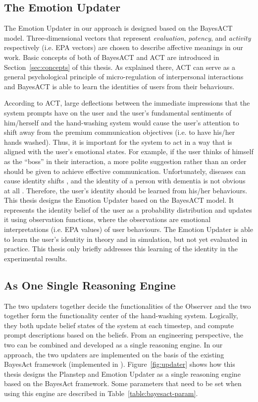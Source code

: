 \subsection{The Emotion Updater}

The Emotion Updater in our approach is designed based on the BayesACT model. Three-dimensional vectors that represent \textit{evaluation}, \textit{potency}, and \textit{activity} respectively (i.e. EPA vectors) are chosen to describe affective meanings in our work. Basic concepts of both of BayesACT and ACT are introduced in Section~\ref{sec:concepts} of this thesis. As explained there, ACT can serve as a general psychological principle of micro-regulation of interpersonal interactions and BayesACT is able to learn the identities of users from their behaviours.

According to ACT, large deflections between the immediate impressions that the system prompts have on the user and the user's fundamental sentiments of him/herself and the hand-washing system would cause the user's attention to shift away from the premium communication objectives (i.e. to have his/her hands washed). Thus, it is important for the system to act in a way that is aligned with the user's emotional states. For example, if the user thinks of himself as the ``boss'' in their interaction, a more polite suggestion rather than an order should be given to achieve effective communication. Unfortunately, diseases can cause identity shifts \cite{lively2011identity}, and the identity of a person with dementia is not obvious at all \cite{orona1990temporality, rose2004memory}. Therefore, the user's identity should be learned from his/her behaviours. This thesis designs the Emotion Updater based on the BayesACT model. It represents the identity belief of the user as a probability distribution and updates it using observation functions, where the observations are emotional interpretations (i.e. EPA values) of user behaviours. The Emotion Updater is able to learn the user's identity in theory and in simulation, but not yet evaluated in practice. This thesis only briefly addresses this learning of the identity in the experimental results. 

\subsection{As One Single Reasoning Engine}
\label{subsec:design-singleengine}

The two updaters together decide the functionalities of the Observer and the two together form the functionality center of the hand-washing system. Logically, they both update belief states of the system at each timestep, and compute prompt descriptions based on the beliefs. From an engineering perspective, the two can be combined and developed as a single reasoning engine. In our approach, the two updaters are implemented on the basis of the existing BayesAct framework (implemented in \cite{hoey2013bayesian}). Figure~\ref{fig:updater} shows how this thesis designs the Planstep and Emotion Updater as a single reasoning engine based on the BayesAct framework. Some parameters that need to be set when using this engine are described in Table~\ref{table:bayesact-param}.

